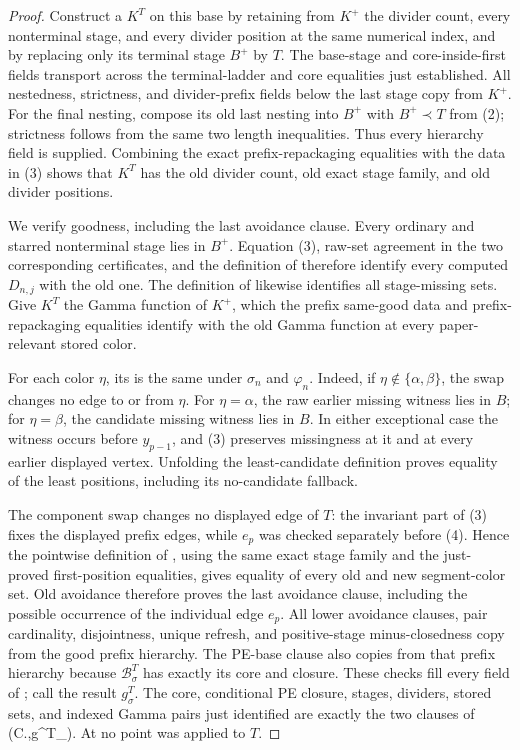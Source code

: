 \begin{proof}
Construct a  \(K^T\) on this base by retaining
from \(K^+\) the divider count, every nonterminal stage, and every divider
position at the same numerical index, and by replacing only its terminal
stage \(B^+\) by \(T\).  The base-stage and core-inside-first fields
transport across the terminal-ladder and core equalities just established.
All nestedness, strictness, and divider-prefix fields below the last stage
copy from \(K^+\).  For the final nesting, compose its old last nesting
into \(B^+\) with \(B^+\prec T\) from (2); strictness follows from the same
two length inequalities.  Thus every hierarchy field is supplied.
Combining the exact prefix-repackaging equalities with the
 data in (3) shows that \(K^T\) has the old
divider count, old exact stage family, and old divider positions.

We verify goodness, including the last avoidance clause.  Every ordinary
and starred nonterminal stage lies in \(B^+\).  Equation (3), raw-set
agreement in the two corresponding certificates, and the definition of
 therefore identify every computed
\(D_{n,j}\) with the old one.  The definition of
 likewise identifies all
stage-missing sets.  Give \(K^T\) the Gamma function of \(K^+\), which the
prefix same-good data and prefix-repackaging equalities identify with the
old Gamma function at every paper-relevant stored color.

For each color \(\eta\), its
 is the same under
\(\sigma_n\) and \(\varphi_n\).  Indeed, if
\(\eta\notin\{\alpha,\beta\}\), the swap changes no edge to or from
\(\eta\).  For \(\eta=\alpha\), the raw earlier missing witness lies in
\(B\); for \(\eta=\beta\), the candidate missing witness lies in \(B\).
In either exceptional case the witness occurs before \(y_{p-1}\), and
(3) preserves missingness at it and at every earlier displayed vertex.
Unfolding the least-candidate definition proves equality of the least
positions, including its no-candidate fallback.

The component swap changes no displayed edge of \(T\): the invariant part
of (3) fixes the displayed prefix edges, while \(e_p\) was checked
separately before (4).  Hence the pointwise definition of
, using the same exact stage family and
the just-proved first-position equalities, gives equality of every old and
new segment-color set.  Old avoidance therefore proves the last avoidance
clause, including the possible occurrence of the individual edge \(e_p\).
All lower avoidance clauses, pair cardinality, disjointness, unique refresh,
and positive-stage minus-closedness copy from the good prefix hierarchy.
The PE-base clause also copies from that prefix hierarchy because
\(\mathcal B^T_\sigma\) has exactly its core and closure.  These checks fill
every field of ; call the result \(g^T_\sigma\).
The core, conditional PE closure, stages, dividers, stored sets, and indexed
Gamma pairs just identified are exactly the two clauses of
(C.,g^T_\sigma).  At no point was
 applied to \(T\).


\end{proof}
